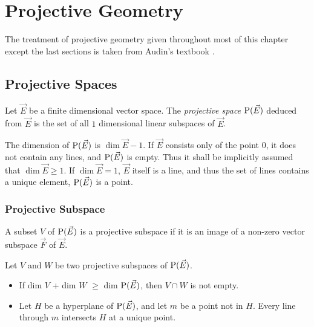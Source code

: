 \chapter{Projective Geometry} \label{chap:projgeo}

The treatment of projective geometry given throughout most of this chapter except
the last sections is taken from Audin's textbook \cite{audin}.

\section{Projective Spaces}

\begin{definition}
  Let $\vec{E}$ be a finite dimensional vector space. The \textit{projective space} $\operatorname{P}(\vec{E})$ deduced
  from $\vec{E}$ is the set of all $1$ dimensional linear subspaces of $\vec{E}$.
\end{definition}

\begin{remark}
  The dimension of $\operatorname{P}(\vec{E})$ is $\dim\vec{E}-1$. If $\vec{E}$ consists only of the point $0$, it does not
  contain any lines, and $\operatorname{P}(\vec{E})$ is empty. Thus it shall be implicitly assumed that $\dim\vec{E} \ge 1$.
  If $\dim\vec{E}=1$, $\vec{E}$ itself is a line, and thus the set of lines contains a unique element,
  $\operatorname{P}(\vec{E})$ is a point.
\end{remark}

\subsection{Projective Subspace}
A subset $V$ of $\operatorname{P}(\vec{E})$ is a projective subspace if it is an image of a non-zero vector subspace
$\vec{F}$ of $\vec{E}$.

\begin{prop}
  Let $V$ and $W$ be two projective subspaces of $\operatorname{P}(\vec{E})$.
  
  \begin{itemize}
    \item If dim $V$ + dim $W$ $\ge$ dim $\operatorname{P}(\vec{E})$, then $V\cap W$ is not empty.
    \item Let $H$ be a hyperplane of $\operatorname{P}(\vec{E})$, and let $m$ be a point not in $H$. Every
      line through $m$ intersects $H$ at a unique point.
  \end{itemize}

\end{prop}

